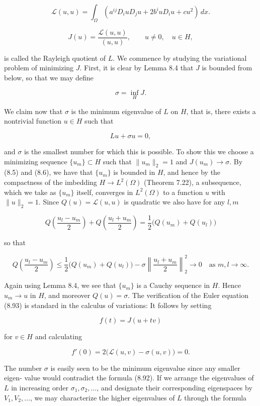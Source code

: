 \[
\mathcal{L}(u,u) = \int_\Omega (a^{ij}D_i u D_j u + 2b^i u D_i u + cu^2)\,dx.
\]



\[
J(u)=\frac{\mathcal{L}(u,u)}{(u,u)}, \qquad u\neq 0,\quad u\in H,
\]

is called the Rayleigh quotient of $L$. We commence by studying the variational
problem of minimizing $J$. First, it is clear by Lemma 8.4 that $J$ is bounded from
below, so that we may define

\begin{equation}
\sigma=\inf_H J.
\tag{8.92}
\end{equation}

We claim now that $\sigma$ is the minimum eigenvalue of $L$ on $H$, that is, there exists a
nontrivial function $u\in H$ such that

\begin{equation}
Lu+\sigma u=0,
\tag{8.93}
\end{equation}

and $\sigma$ is the smallest number for which this is possible. To show this we choose a
minimizing sequence $\{u_m\}\subset H$ such that $\|u_m\|_2=1$ and $J(u_m)\to \sigma$. By (8.5) and
(8.6), we have that $\{u_m\}$ is bounded in $H$, and hence by the compactness of the
imbedding $H\to L^2(\Omega)$ (Theorem 7.22), a subsequence, which we take as $\{u_m\}$ itself,
converges in $L^2(\Omega)$ to a function $u$ with $\|u\|_2=1$. Since $Q(u)=\mathcal{L}(u,u)$ is quadratic
we also have for any $l,m$

\[
Q\!\left(\frac{u_l-u_m}{2}\right)+Q\!\left(\frac{u_l+u_m}{2}\right)
=\frac{1}{2}\bigl(Q(u_m)+Q(u_l)\bigr)
\]

so that

\[
Q\!\left(\frac{u_l-u_m}{2}\right)\le \frac{1}{2}\bigl(Q(u_m)+Q(u_l)\bigr)-\sigma\left\|\frac{u_l+u_m}{2}\right\|_2^2\to 0
\quad \text{as } m,l\to\infty.
\]

Again using Lemma 8.4, we see that $\{u_m\}$ is a Cauchy sequence in $H$. Hence $u_m\to u$
in $H$, and moreover $Q(u)=\sigma$. The verification of the Euler equation (8.93) is
standard in the calculus of variations: It follows by setting

\[
f(t)=J(u+tv)
\]

for $v\in H$ and calculating

\[
f'(0)=2\bigl(\mathcal{L}(u,v)-\sigma (u,v)\bigr)=0.
\]

The number $\sigma$ is easily seen to be the minimum eigenvalue since any smaller eigen-
value would contradict the formula (8.92). If we arrange the eigenvalues of $L$ in
increasing order $\sigma_1,\sigma_2,\ldots$, and designate their corresponding eigenspaces by
$V_1,V_2,\ldots$, we may characterize the higher eigenvalues of $L$ through the formula

